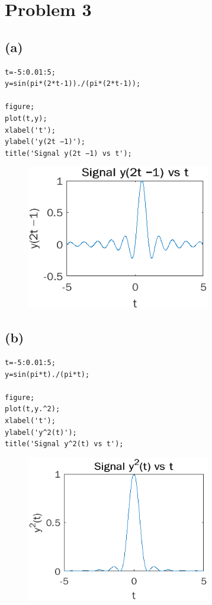 \documentclass[12pt]{article}
\begin{document}
\section*{Problem 3}
\subsection*{(a)}
\begin{lstlisting}
t=-5:0.01:5;
y=sin(pi*(2*t-1))./(pi*(2*t-1));

figure;
plot(t,y);
xlabel('t');
ylabel('y(2t −1)');
title('Signal y(2t −1) vs t');
\end{lstlisting}
\begin{figure}[h]
\includegraphics[width=8cm]{3a}
\end{figure}
\subsection*{(b)}
\begin{lstlisting}
t=-5:0.01:5;
y=sin(pi*t)./(pi*t);

figure;
plot(t,y.^2);
xlabel('t');
ylabel('y^2(t)');
title('Signal y^2(t) vs t');
\end{lstlisting}
\begin{figure}[h]
\includegraphics[width=8cm]{3b}
\end{figure}
\end{document}
